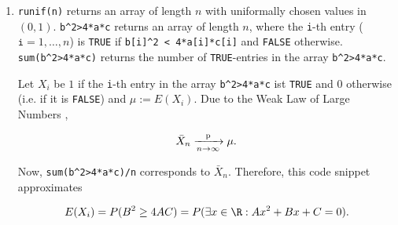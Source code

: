 \begin{solution}
\begin{enumerate}[label = (\alph*)]
\begin{enumerate}[label = \arabic*.]
    \end{enumerate}

    \item \verb|runif(n)| returns an array of length $n$ with uniformally chosen values in $(0, 1)$.
    \verb|b^2>4*a*c| returns an array of length $n$, where the \texttt{i}-th entry ($\texttt{i} = 1, \dots, n$) is \texttt{TRUE} if \verb|b[i]^2 < 4*a[i]*c[i]| and \texttt{FALSE} otherwise.
    \verb|sum(b^2>4*a*c)| returns the number of \texttt{TRUE}-entries in the array \verb|b^2>4*a*c|.

    Let $X_i$ be $1$ if the \texttt{i}-th entry in the array \verb|b^2>4*a*c| ist \texttt{TRUE} and $0$ otherwise (i.e. if it is \texttt{FALSE}) and $\mu := E(X_i)$.
    Due to the Weak Law of Large Numbers \cite[Lecture 4, Slide 52]{EStat},

    \begin{align*}
        \bar X_n \xrightarrow[n \to \infty]{\text p} \mu.
    \end{align*}

    Now, \verb|sum(b^2>4*a*c)/n| corresponds to $\bar X_n$.
    Therefore, this code snippet approximates

    \begin{align*}
        E(X_i)
        =
        P(B^2 \geq 4 A C)
        =
        P(\exists x \in \R: A x^2 + B x + C = 0).
    \end{align*}

\end{enumerate}

\end{solution}


